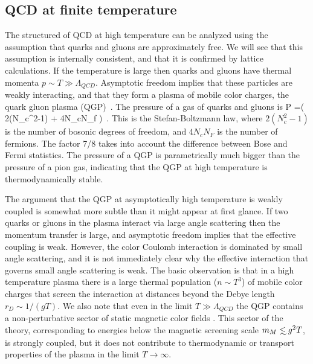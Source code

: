 \subsection{QCD at finite temperature}
\label{sec_qcd_T}

 The structured of QCD at high temperature can be analyzed using the 
assumption that quarks and gluons are approximately free. We will 
see that this assumption is internally consistent, and that it is 
confirmed by lattice calculations. If the temperature is large then
quarks and gluons have thermal momenta $p\sim T\gg\Lambda_{QCD}$. 
Asymptotic freedom implies that these particles are weakly interacting, 
and that they form a plasma of mobile color charges, the quark gluon 
plasma (QGP)~\cite{Shuryak:1977ut,Shuryak:1978ij}. The pressure of 
a gas of quarks and gluons is
\be  
P =\left( 2\left(N_c^2-1\right)
  + 4N_cN_f \right)\,  . 
\ee
This is the Stefan-Boltzmann law, where $2(N_c^2-1)$ is the number
of bosonic degrees of freedom, and $4N_cN_F$ is the number of fermions. 
The factor 7/8 takes into account the difference between Bose and
Fermi statistics. The pressure of a QGP is parametrically much bigger
than the pressure of a pion gas, indicating that the QGP at high
temperature is thermodynamically stable. 

  The argument that the QGP at asymptotically high temperature is 
weakly coupled is somewhat more subtle than it might appear at first 
glance. If two quarks or gluons in the plasma interact via large angle 
scattering then the momentum transfer is large, and asymptotic freedom
implies that the effective coupling is weak. However, the color Coulomb 
interaction is dominated by small angle scattering, and it is not 
immediately clear why the effective interaction that governs small 
angle scattering is weak. The basic observation is that in a high 
temperature plasma there is a large thermal population ($n\sim T^3$) 
of mobile color charges that screen the interaction at distances beyond 
the Debye length $r_D\sim 1/(gT)$. We also note that even in the limit 
$T\gg\Lambda_{QCD}$ the QGP contains a non-perturbative sector of 
static magnetic color fields \cite{Linde:1980ts}. This sector of
the theory, corresponding to energies below the magnetic screening
scale $m_M\lsim g^2T$, is strongly coupled, but it does not contribute 
to thermodynamic or transport properties of the plasma in the limit 
$T\to\infty$.

